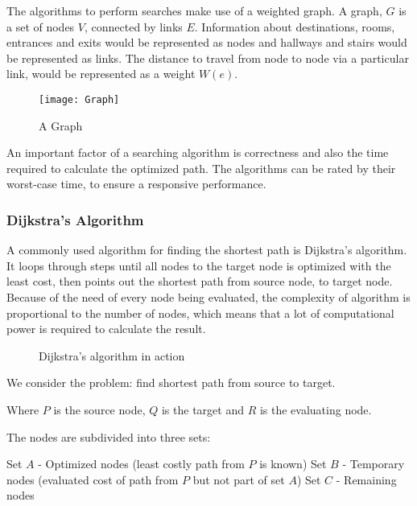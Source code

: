   The algorithms to perform searches make use of a weighted graph. A graph, $G$ is a set of nodes $V$, connected by links $E$.
  Information about destinations, rooms, entrances and exits would be represented as nodes and hallways and stairs would be represented as links. The distance to travel from node to node via a particular link, would be represented as a weight $W(e)$.

  \begin{figure}[ht!]
    \centering
    \texttt{[image: Graph]}
    \caption{A Graph}
    \label{overflow}
  \end{figure}

  An important factor of a searching algorithm is correctness and also the time required to calculate the optimized path.
  The algorithms can be rated by their worst-case time, to ensure a responsive performance.

  \subsubsection{Dijkstra's Algorithm}

  A commonly used algorithm for finding the shortest path is Dijkstra's algorithm. It loops through steps until all nodes to the target node is optimized with the least cost, then points out the shortest path from source node, to target node. Because of the need of every node being evaluated, the complexity of algorithm is proportional to the number of nodes, which means that a lot of computational power is required to calculate the result.  \cite{Dijkstra}

  \begin{figure}[ht!]
    \centering
    \caption{Dijkstra's algorithm in action}
    \label{overflow}
  \end{figure}

  We consider the problem: find shortest path from source to target.

  Where $P$ is the source node, $Q$ is the target and $R$ is the evaluating node.

  The nodes are subdivided into three sets:

  Set $A$ - Optimized nodes (least costly path from $P$ is known)
  Set $B$ - Temporary nodes (evaluated cost of path from $P$ but not part of set $A$)
  Set $C$ - Remaining nodes


